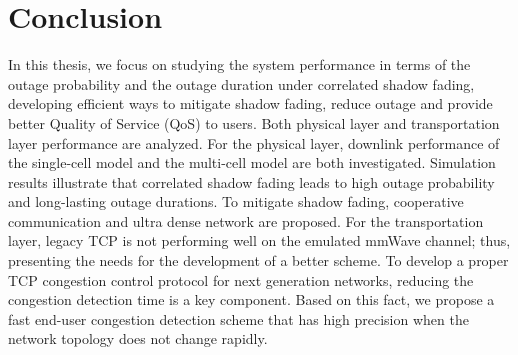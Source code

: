 \chapter{Conclusion}\label{ch:6}
 \par In this thesis, we focus on studying the system performance in terms of the outage probability and the outage duration under correlated shadow fading, developing efficient ways to mitigate shadow fading, reduce outage and provide better Quality of Service (QoS) to users. Both physical layer and transportation layer performance are analyzed. For the physical layer, downlink performance of the single-cell model and the multi-cell model are both investigated. Simulation results illustrate that correlated shadow fading leads to high outage probability and long-lasting outage durations. To mitigate shadow fading, cooperative communication and ultra dense network are proposed. For the transportation layer, legacy TCP is not performing well on the emulated mmWave channel; thus, presenting the needs for the development of a better scheme. To develop a proper TCP congestion control protocol for next generation networks, reducing the congestion detection time is a key component. Based on this fact, we propose a fast end-user congestion detection scheme that has high precision when the network topology does not change rapidly.
